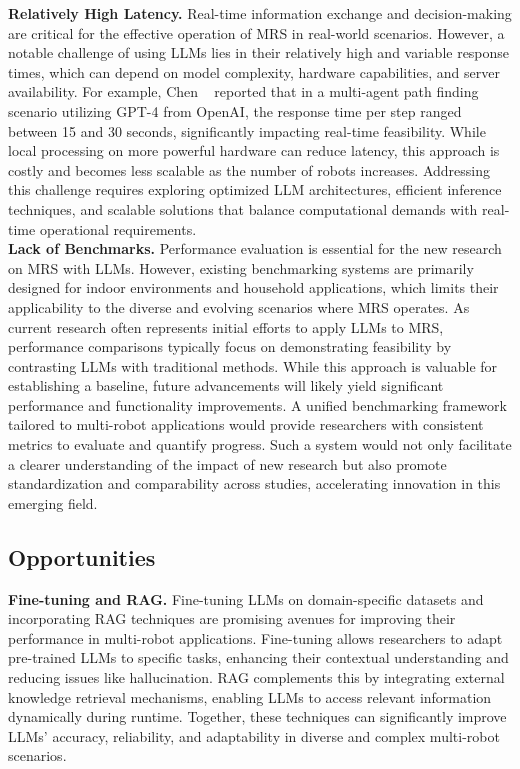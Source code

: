 \noindent\textbf{Relatively High Latency.}
Real-time information exchange and decision-making are critical for the effective operation of MRS in real-world scenarios. However, a notable challenge of using LLMs lies in their relatively high and variable response times, which can depend on model complexity, hardware capabilities, and server availability. For example, Chen \etal~\cite{chen_why_2024} reported that in a multi-agent path finding scenario utilizing GPT-4 from OpenAI, the response time per step ranged between 15 and 30 seconds, significantly impacting real-time feasibility. While local processing on more powerful hardware can reduce latency, this approach is costly and becomes less scalable as the number of robots increases. Addressing this challenge requires exploring optimized LLM architectures, efficient inference techniques, and scalable solutions that balance computational demands with real-time operational requirements.\\

\noindent\textbf{Lack of Benchmarks.}
Performance evaluation is essential for the new research on MRS with LLMs. However, existing benchmarking systems are primarily designed for indoor environments and household applications, which limits their applicability to the diverse and evolving scenarios where MRS operates. As current research often represents initial efforts to apply LLMs to MRS, performance comparisons typically focus on demonstrating feasibility by contrasting LLMs with traditional methods. While this approach is valuable for establishing a baseline, future advancements will likely yield significant performance and functionality improvements. A unified benchmarking framework tailored to multi-robot applications would provide researchers with consistent metrics to evaluate and quantify progress. Such a system would not only facilitate a clearer understanding of the impact of new research but also promote standardization and comparability across studies, accelerating innovation in this emerging field.


\subsection{Opportunities}

\textbf{Fine-tuning and RAG.}
Fine-tuning LLMs on domain-specific datasets and incorporating RAG techniques are promising avenues for improving their performance in multi-robot applications. Fine-tuning allows researchers to adapt pre-trained LLMs to specific tasks, enhancing their contextual understanding and reducing issues like hallucination. RAG complements this by integrating external knowledge retrieval mechanisms, enabling LLMs to access relevant information dynamically during runtime. Together, these techniques can significantly improve LLMs' accuracy, reliability, and adaptability in diverse and complex multi-robot scenarios.\\

